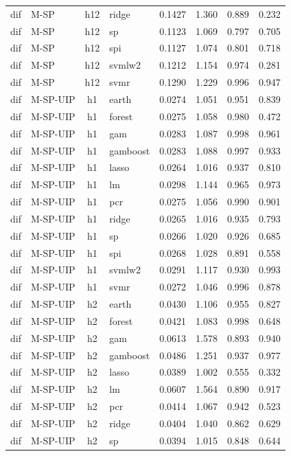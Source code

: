 \begin{ThreePartTable}
\begin{longtable}[t]{llclcccc}
dif & M-SP & h12 & ridge & 0.1427 & 1.360 & 0.889 & 0.232\\
dif & M-SP & h12 & sp & 0.1123 & 1.069 & 0.797 & 0.705\\
dif & M-SP & h12 & spi & 0.1127 & 1.074 & 0.801 & 0.718\\
dif & M-SP & h12 & svmlw2 & 0.1212 & 1.154 & 0.974 & 0.281\\
dif & M-SP & h12 & svmr & 0.1290 & 1.229 & 0.996 & 0.947\\
\addlinespace
dif & M-SP-UIP & h1 & earth & 0.0274 & 1.051 & 0.951 & 0.839\\
dif & M-SP-UIP & h1 & forest & 0.0275 & 1.058 & 0.980 & 0.472\\
dif & M-SP-UIP & h1 & gam & 0.0283 & 1.087 & 0.998 & 0.961\\
dif & M-SP-UIP & h1 & gamboost & 0.0283 & 1.088 & 0.997 & 0.933\\
dif & M-SP-UIP & h1 & lasso & 0.0264 & 1.016 & 0.937 & 0.810\\
dif & M-SP-UIP & h1 & lm & 0.0298 & 1.144 & 0.965 & 0.973\\
dif & M-SP-UIP & h1 & pcr & 0.0275 & 1.056 & 0.990 & 0.901\\
dif & M-SP-UIP & h1 & ridge & 0.0265 & 1.016 & 0.935 & 0.793\\
dif & M-SP-UIP & h1 & sp & 0.0266 & 1.020 & 0.926 & 0.685\\
dif & M-SP-UIP & h1 & spi & 0.0268 & 1.028 & 0.891 & 0.558\\
dif & M-SP-UIP & h1 & svmlw2 & 0.0291 & 1.117 & 0.930 & 0.993\\
dif & M-SP-UIP & h1 & svmr & 0.0272 & 1.046 & 0.996 & 0.878\\
\addlinespace
dif & M-SP-UIP & h2 & earth & 0.0430 & 1.106 & 0.955 & 0.827\\
dif & M-SP-UIP & h2 & forest & 0.0421 & 1.083 & 0.998 & 0.648\\
dif & M-SP-UIP & h2 & gam & 0.0613 & 1.578 & 0.893 & 0.940\\
dif & M-SP-UIP & h2 & gamboost & 0.0486 & 1.251 & 0.937 & 0.977\\
dif & M-SP-UIP & h2 & lasso & 0.0389 & 1.002 & 0.555 & 0.332\\
dif & M-SP-UIP & h2 & lm & 0.0607 & 1.564 & 0.890 & 0.917\\
dif & M-SP-UIP & h2 & pcr & 0.0414 & 1.067 & 0.942 & 0.523\\
dif & M-SP-UIP & h2 & ridge & 0.0404 & 1.040 & 0.862 & 0.629\\
dif & M-SP-UIP & h2 & sp & 0.0394 & 1.015 & 0.848 & 0.644\\

\end{longtable}
\end{ThreePartTable}
